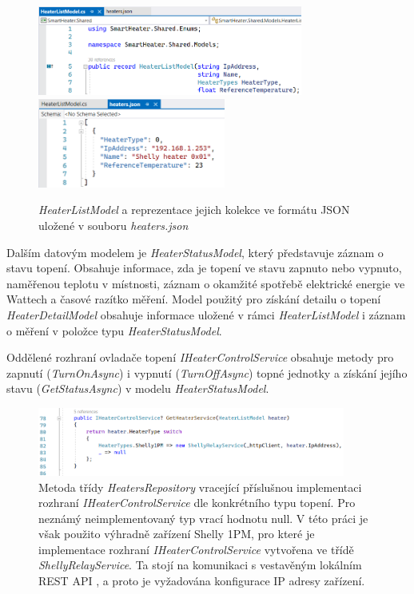 \pagebreak

\begin{figure}[hbt]
\centering
\includegraphics[height=2.94cm]{obrazky-figures/code-heaterslistmodel.png}
\includegraphics[height=2.94cm]{obrazky-figures/code-heatersjson.png}
\caption{{\it HeaterListModel} a reprezentace jejich kolekce ve formátu JSON uložené v souboru {\it heaters.json}}
\end{figure}

Dalším datovým modelem je {\it HeaterStatusModel}, který představuje záznam o stavu topení. Obsahuje informace, zda je topení ve stavu zapnuto nebo vypnuto, naměřenou teplotu v místnosti, záznam o okamžité spotřebě elektrické energie ve Wattech a časové razítko měření. Model použitý pro získání detailu o topení {\it HeaterDetailModel} obsahuje informace uložené v rámci {\it HeaterListModel} i záznam o měření v položce typu {\it HeaterStatusModel}.

Oddělené rozhraní ovladače topení {\it IHeaterControlService} obsahuje metody pro zapnutí ({\it TurnOnAsync}) i vypnutí ({\it TurnOffAsync}) topné jednotky a získání jejího stavu ({\it GetStatusAsync}) v modelu {\it HeaterStatusModel}.

\begin{figure}[hbt]
\includegraphics[width=0.9\textwidth]{obrazky-figures/code-heaterservice-decode.png}
\caption{Metoda třídy {\it HeatersRepository} vracející příslušnou implementaci rozhraní {\it IHeaterControlService} dle konkrétního typu topení. Pro neznámý neimplementovaný typ vrací hodnotu null. V této práci je však použito výhradně zařízení Shelly 1PM, pro které je implementace rozhraní {\it IHeaterControlService} vytvořena ve třídě {\it ShellyRelayService}. Ta stojí na komunikaci s vestavěným lokálním REST API \cite{shelly_api}, a proto je vyžadována konfigurace IP adresy zařízení.}
\end{figure}

